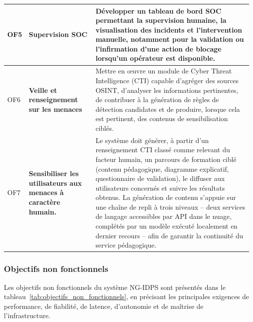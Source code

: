 \begin{longtable}{|p{}|p{}|p{}|}
OF5 &
\textbf{Supervision SOC} &
Développer un tableau de bord SOC permettant la supervision humaine, la visualisation des incidents et l'intervention manuelle, notamment pour la validation ou l'infirmation d'une action de blocage lorsqu'un opérateur est disponible. \\ \hline

OF6 &
\textbf{Veille et renseignement sur les menaces} &
Mettre en œuvre un module de Cyber Threat Intelligence (CTI) capable d'agréger des sources OSINT, d'analyser les informations pertinentes, de contribuer à la génération de règles de détection candidates et de produire, lorsque cela est pertinent, des contenus de sensibilisation ciblés. \\ \hline

OF7 &
\textbf{Sensibiliser les utilisateurs aux menaces à caractère humain.} & 
Le système doit générer, à partir d'un renseignement \ac{CTI} classé comme relevant du facteur humain, un parcours de formation ciblé (contenu pédagogique, diagramme explicatif, questionnaire de validation), le diffuser aux utilisateurs concernés et suivre les résultats obtenus. La génération de contenu s'appuie sur une chaîne de repli à trois niveaux -- deux services de langage accessibles par \ac{API} dans le nuage, complétés par un modèle exécuté localement en dernier recours -- afin de garantir la continuité du service pédagogique. \\ \hline
\end{longtable}

\subsubsection*{Objectifs non fonctionnels}

Les objectifs non fonctionnels du système NG-IDPS sont présentés dans le tableau~\ref{tab:objectifs_non_fonctionnels}, en précisant les principales exigences de performance, de fiabilité, de latence, d'autonomie et de maîtrise de l'infrastructure.

\renewcommand{\arraystretch}{1.5}

